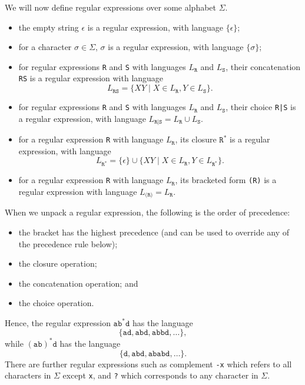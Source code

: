 \documentclass[a4paper, openany]{memoir}
\begin{document}
    We will now define regular expressions over some alphabet $\Sigma$.
    \begin{itemize}
        \item the empty string $\epsilon$ is a regular expression, with language $\{\epsilon\}$;
        \item for a character $\sigma \in \Sigma$, $\sigma$ is a regular expression, with language $\{\sigma\}$;
        \item for regular expressions \texttt{R} and \texttt{S} with languages $L_{\texttt{R}}$ and $L_{\texttt{S}}$, their concatenation \texttt{RS} is a regular expression with language
        \[L_{\texttt{RS}} = \{XY \mid X \in L_{\texttt{R}}, Y \in L_{\texttt{S}}\}.\]
        \item for regular expressions \texttt{R} and \texttt{S} with languages $L_{\texttt{R}}$ and $L_{\texttt{S}}$, their choice \texttt{R|S} is a regular expression, with language $L_{\texttt{R|S}} = L_{\texttt{R}} \cup L_{\texttt{S}}$.
        \item for a regular expression \texttt{R} with language $L_{\texttt{R}}$, its closure $\texttt{R}^*$ is a regular expression, with language 
        \[L_{\texttt{R}^*} = \{\epsilon\} \cup \{XY \mid X \in L_{\texttt{R}}, Y \in L_{\texttt{R}^*}\}.\]
        \item for a regular expression \texttt{R} with language $L_{\texttt{R}}$, its bracketed form \texttt{(R)} is a regular expression with language $L_{\texttt{(R)}} = L_{\texttt{R}}$.
    \end{itemize}

    When we unpack a regular expression, the following is the order of precedence:
    \begin{itemize}
        \item the bracket has the highest precedence (and can be used to override any of the precedence rule below);
        \item the closure operation;
        \item the concatenation operation; and
        \item the choice operation.
    \end{itemize}
    Hence, the regular expression $\texttt{ab}^*\texttt{d}$ has the language
    \[\{\texttt{ad}, \texttt{abd}, \texttt{abbd}, \dots\},\]
    while $(\texttt{ab})^* \texttt{d}$ has the language
    \[\{\texttt{d}, \texttt{abd}, \texttt{ababd}, \dots\}.\]
    There are further regular expressions such as complement \texttt{-x} which refers to all characters in $\Sigma$ except \texttt{x}, and \texttt{?} which corresponds to any character in $\Sigma$.
\end{document}
